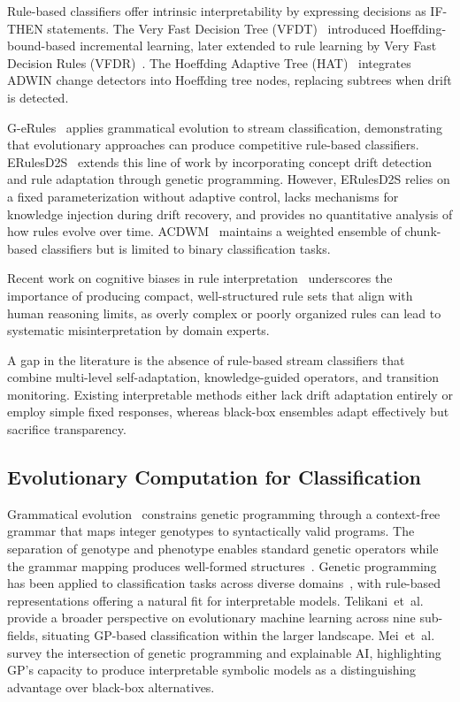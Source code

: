 \documentclass[lettersize,journal]{IEEEtran}
\begin{document}
Rule-based classifiers offer intrinsic interpretability by expressing decisions as IF-THEN statements. The Very Fast Decision Tree (VFDT)~\cite{domingos2000vfdt} introduced Hoeffding-bound-based incremental learning, later extended to rule learning by Very Fast Decision Rules (VFDR)~\cite{kosina2015vfdr}. The Hoeffding Adaptive Tree (HAT)~\cite{bifet2009adaptive} integrates ADWIN change detectors into Hoeffding tree nodes, replacing subtrees when drift is detected.

G-eRules~\cite{shaker2012evolving} applies grammatical evolution to stream classification, demonstrating that evolutionary approaches can produce competitive rule-based classifiers. ERulesD2S~\cite{de2019erulesd2s} extends this line of work by incorporating concept drift detection and rule adaptation through genetic programming. However, ERulesD2S relies on a fixed parameterization without adaptive control, lacks mechanisms for knowledge injection during drift recovery, and provides no quantitative analysis of how rules evolve over time. ACDWM~\cite{lu2017adaptive} maintains a weighted ensemble of chunk-based classifiers but is limited to binary classification tasks.

Recent work on cognitive biases in rule interpretation~\cite{kliegr2021cognitive} underscores the importance of producing compact, well-structured rule sets that align with human reasoning limits, as overly complex or poorly organized rules can lead to systematic misinterpretation by domain experts.

A gap in the literature is the absence of rule-based stream classifiers that combine multi-level self-adaptation, knowledge-guided operators, and transition monitoring. Existing interpretable methods either lack drift adaptation entirely or employ simple fixed responses, whereas black-box ensembles adapt effectively but sacrifice transparency.

\subsection{Evolutionary Computation for Classification}

Grammatical evolution~\cite{oneill2003grammatical} constrains genetic programming through a context-free grammar that maps integer genotypes to syntactically valid programs. The separation of genotype and phenotype enables standard genetic operators while the grammar mapping produces well-formed structures~\cite{ryan1998grammatical}. Genetic programming has been applied to classification tasks across diverse domains~\cite{espejo2010gp}, with rule-based representations offering a natural fit for interpretable models. Telikani~et~al.~\cite{telikani2021evolutionary} provide a broader perspective on evolutionary machine learning across nine sub-fields, situating GP-based classification within the larger landscape. Mei~et~al.~\cite{mei2023gp} survey the intersection of genetic programming and explainable AI, highlighting GP's capacity to produce interpretable symbolic models as a distinguishing advantage over black-box alternatives.
\end{document}
